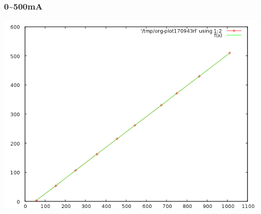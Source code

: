 \documentclass[bigger]{beamer}
\begin{document}
\begin{frame}
\frametitle{0\~{}500mA}
\label{sec-3-7}

\includegraphics[width=.9\linewidth]{500ma.png}
\end{frame}
\end{document}
